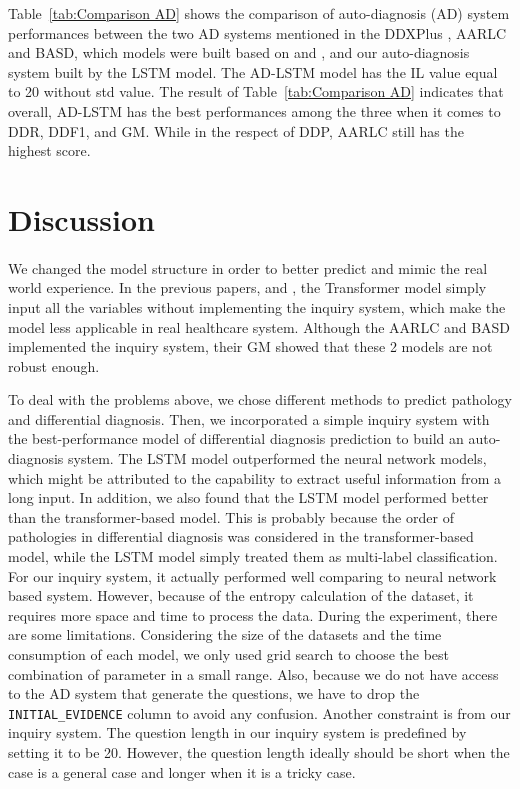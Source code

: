 \documentclass{article}
\begin{document}
Table~\ref{tab:Comparison AD} shows the comparison of auto-diagnosis (AD) system performances between the two AD systems mentioned in the DDXPlus \parencite{Fansi_2022}, AARLC and BASD, which models were built based on \parencite{Yuan_2024} and \parencite{Luo_2021}, and our auto-diagnosis system built by the LSTM model. The AD-LSTM model has the IL value equal to 20 without std value. The result of Table~\ref{tab:Comparison AD} indicates that overall, AD-LSTM has the best performances among the three when it comes to DDR, DDF1, and GM. While in the respect of DDP, AARLC still has the highest score.

\section{Discussion}
\paragraph{ }
We changed the model structure in order to better predict and mimic the real world experience. In the previous papers, \parencite{Fansi_2022} and \parencite{Alam_2023}, the Transformer model simply input all the variables without implementing the inquiry system, which make the model less applicable in real healthcare system. Although the AARLC and BASD implemented the inquiry system, their GM showed that these 2 models are not robust enough. 

To deal with the problems above, we chose different methods to predict pathology and differential diagnosis. Then, we incorporated a simple inquiry system with  the best-performance model of differential diagnosis prediction to build an auto-diagnosis system. The LSTM model outperformed the neural network models, which might be attributed to the capability to extract useful information from a long input. In addition, we also found that the LSTM model performed better than the transformer-based model. This is probably because the order of pathologies in differential diagnosis was considered in the transformer-based model, while the LSTM model simply treated them as multi-label classification. For our inquiry system, it actually performed well comparing to neural network based system. However, because of the entropy calculation of the dataset, it requires more space and time to process the data.
During the experiment, there are some limitations. Considering the size of the datasets and the time consumption of each model, we only used grid search to choose the best combination of parameter in a small range. Also, because we do not have access to the AD system that generate the questions, we have to drop the \verb|INITIAL_EVIDENCE| column to avoid any confusion. Another constraint is from our inquiry system. The question length in our inquiry system is predefined by setting it to be 20. However, the question length ideally should be short when the case is a general case and longer when it is a tricky case.
\end{document}
